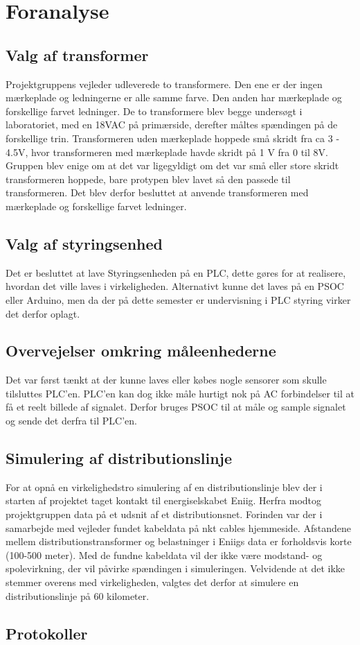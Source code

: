 
\chapter{Foranalyse}

\section{Valg af transformer}
Projektgruppens vejleder udleverede to transformere. Den ene er der ingen mærkeplade og ledningerne er alle samme farve. Den anden har mærkeplade og forskellige farvet ledninger. De to transformere blev begge undersøgt i laboratoriet, med en 18VAC på primærside, derefter måltes spændingen på de forskellige trin. Transformeren uden mærkeplade hoppede små skridt fra ca 3 - 4.5V, hvor transformeren med mærkeplade havde skridt på 1 V fra 0 til 8V. Gruppen blev enige om at det var ligegyldigt om det var små eller store skridt transformeren hoppede, bare protypen blev lavet så den passede til transformeren. Det blev derfor besluttet at anvende transformeren med mærkeplade og forskellige farvet ledninger. 

\section{Valg af styringsenhed}
Det er besluttet at lave Styringsenheden på en PLC, dette gøres for at realisere, hvordan det ville laves i virkeligheden. Alternativt kunne det laves på en PSOC eller Arduino, men da der på dette semester er undervisning i PLC styring virker det derfor oplagt.

\section{Overvejelser omkring måleenhederne}
Det var først tænkt at der kunne laves eller købes nogle sensorer som skulle tilsluttes PLC'en. PLC'en kan dog ikke måle hurtigt nok på AC forbindelser til at få et reelt billede af signalet. Derfor bruges PSOC til at måle og sample signalet og sende det derfra til PLC'en.

\section{Simulering af distributionslinje}
For at opnå en virkelighedstro simulering af en distributionslinje blev der i starten af projektet taget kontakt til energiselskabet Eniig. Herfra modtog projektgruppen data på et udsnit af et distributionsnet. Forinden var der i samarbejde med vejleder fundet kabeldata på nkt cables hjemmeside. Afstandene mellem distributionstransformer og belastninger i Eniigs data er forholdsvis korte (100-500 meter). Med de fundne kabeldata vil der ikke være modstand- og spolevirkning, der vil påvirke spændingen i simuleringen. Velvidende at det ikke stemmer overens med virkeligheden, valgtes det derfor at simulere en distributionslinje på 60 kilometer. 

\section{Protokoller}



